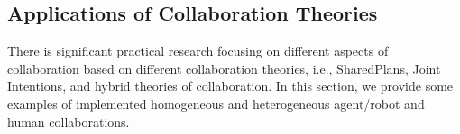 \documentclass[12pt]{report}
\begin{document}

\subsection{Applications of Collaboration Theories}
\label{sec:applicaiton}

There is significant practical research focusing on different aspects of
collaboration based on different collaboration theories, i.e., SharedPlans,
Joint Intentions, and hybrid theories of collaboration. In this section, we
provide some examples of implemented homogeneous and heterogeneous agent/robot
and human collaborations.
\end{document}
